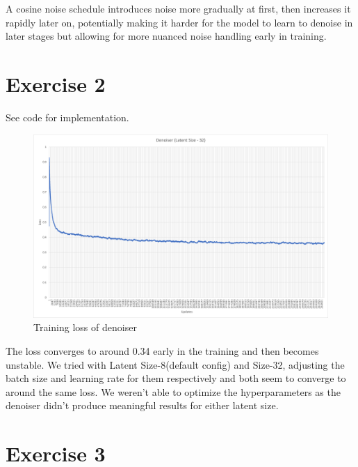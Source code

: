 \documentclass[11pt]{article}
\numberwithin{equation}{section}
\begin{document}
A cosine noise schedule introduces noise more gradually at first, then increases it rapidly later on, potentially making it harder for the model to learn to denoise in later stages but allowing for more nuanced noise handling early in training.

\section{Exercise 2}
See code for implementation.

\newpage
\begin{figure}[h]
	\caption{Training loss of denoiser}
	\label{fig:inprec2}
	\centering
	\includegraphics[width=1\textwidth]{report/trainlossDenoiser32.png}%
\end{figure}

The loss converges to around 0.34 early in the training and then becomes unstable.
We tried with Latent Size-8(default config) and Size-32, adjusting the batch size and learning rate for them respectively and both seem to converge to around the same loss. We weren't able to optimize the hyperparameters as the denoiser didn't produce meaningful results for either latent size.

\section{Exercise 3}
\end{document}
